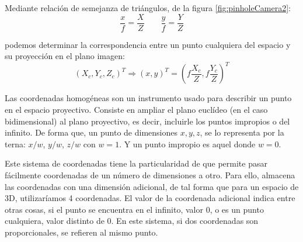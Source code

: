 Mediante relación de semejanza de triángulos, de la figura \ref{fig:pinholeCamera2}: 
\begin{equation}
\dfrac{x}{f} = \dfrac{X}{Z} \quad \quad \dfrac{y}{f} = \dfrac{Y}{Z} 
\end{equation}

podemos determinar la correspondencia entre un punto cualquiera del espacio y su proyección en el plano imagen:
\begin{equation}
  (X_c , Y_c , Z_c )^T \Longrightarrow  (x, y)^T = (f \dfrac{X_c}{Z}, f \dfrac{Y_c}{Z})^T
\end{equation}

Las coordenadas homogéneas son un instrumento usado para describir un punto en el espacio proyectivo. Consiste en ampliar el plano euclídeo (en el caso bidimensional) al plano proyectivo, es decir, incluirle los puntos impropios o del infinito. De forma que, un punto de dimensiones $x, y, z$, se lo representa por la terna: $x/w$, $y/w$, $z/w$ con $w=1$. Y un punto impropio es aquel donde $w=0$.

Este sistema de coordenadas tiene la particularidad de que permite pasar fácilmente coordenadas de un número de dimensiones a otro. Para ello, almacena las coordenadas con una dimensión adicional, de tal forma que para un espacio de 3D, utilizaríamos 4 coordenadas. El valor de la coordenada adicional indica entre otras cosas, si el punto se encuentra en el infinito, valor 0, o es un punto cualquiera, valor distinto de 0. En este sistema, si dos coordenadas son proporcionales, se refieren al mismo punto.

